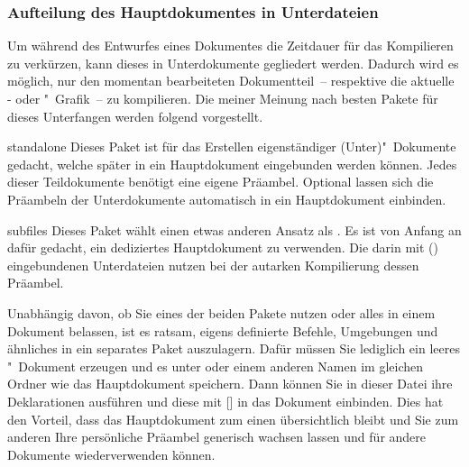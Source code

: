 \subsubsection{Aufteilung des Hauptdokumentes in Unterdateien}
Um während des Entwurfes eines Dokumentes die Zeitdauer für das Kompilieren zu 
verkürzen, kann dieses in Unterdokumente gegliedert werden. Dadurch wird es 
möglich, nur den momentan bearbeiteten Dokumentteil~-- respektive die aktuelle 
- oder "~Grafik~-- zu kompilieren. Die meiner 
Meinung nach besten Pakete für dieses Unterfangen werden folgend vorgestellt.
%
\begin{packages}
\item[standalone]
  Dieses Paket ist für das Erstellen eigenständiger (Unter)"~Dokumente gedacht, 
  welche später in ein Hauptdokument eingebunden werden können. Jedes dieser 
  Teildokumente benötigt eine eigene Präambel. Optional lassen sich die 
  Präambeln der Unterdokumente automatisch in ein Hauptdokument einbinden.
\item[subfiles]
  Dieses Paket wählt einen etwas anderen Ansatz als . Es 
  ist von Anfang an dafür gedacht, ein dediziertes Hauptdokument zu verwenden. 
  Die darin mit () eingebundenen Unterdateien 
  nutzen bei der autarken Kompilierung dessen Präambel.
\end{packages}
%
Unabhängig davon, ob Sie eines der beiden Pakete nutzen oder alles in einem 
Dokument belassen, ist es ratsam, eigens definierte Befehle, Umgebungen und 
ähnliches in ein separates Paket auszulagern. Dafür müssen Sie lediglich ein 
leeres "~Dokument erzeugen und es unter  
oder einem anderen Namen im gleichen Ordner wie das Hauptdokument speichern. 
Dann können Sie in dieser Datei ihre Deklarationen ausführen und diese mit 
[] in das Dokument einbinden. Dies 
hat den Vorteil, dass das Hauptdokument zum einen übersichtlich bleibt und Sie 
zum anderen Ihre persönliche Präambel generisch wachsen lassen und für andere 
Dokumente wiederverwenden können.


